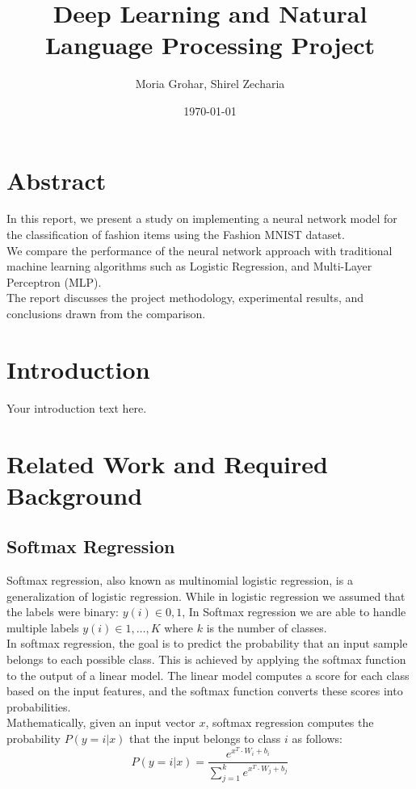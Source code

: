 \documentclass{article}
\title{Deep Learning and Natural Language Processing Project}
\author{Moria Grohar, Shirel Zecharia}
\date{\today}
\begin{document}
\maketitle

\section{Abstract}
In this report, we present a study on implementing a neural network model for the classification of fashion items using the Fashion MNIST dataset.\\
We compare the performance of the neural network approach with traditional machine learning algorithms such as Logistic Regression, and Multi-Layer Perceptron (MLP).\\
The report discusses the project methodology, experimental results, and conclusions drawn from the comparison.

\section{Introduction}
Your introduction text here.

\section{Related Work and Required Background}

\subsection{Softmax Regression}
Softmax regression, also known as multinomial logistic regression, is a generalization of logistic regression.
While in logistic regression we assumed that the labels were binary: ${y(i)\in{0,1}}$, In Softmax regression we are able to handle multiple labels ${y(i)\in{1,…,K}}$ where ${k}$ is the number of classes.\\

In softmax regression, the goal is to predict the probability that an input sample belongs to each possible class. This is achieved by applying the softmax function to the output of a linear model. The linear model computes a score for each class based on the input features, and the softmax function converts these scores into probabilities.\\

Mathematically, given an input vector ${x}$, softmax regression computes the probability ${P(y=i | x)}$ that the input belongs to class ${i}$ as follows:
$${P(y=i | x) = \frac{e^{x^{T} \cdot W_i + b_i}}{\sum_{j=1}^{k} e^{x^{T} \cdot W_j + b_j}}
}$$
\end{document}
